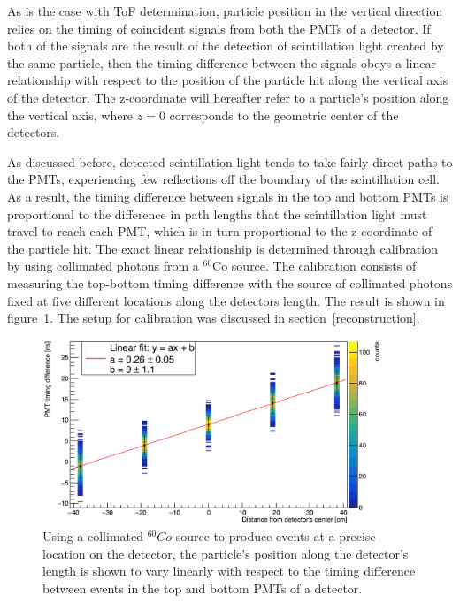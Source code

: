 As is the case with ToF determination, particle position in the vertical direction relies on the timing of coincident signals from both the PMTs of a detector. If both of the signals are the result of the detection of scintillation light created by the same particle, then the timing difference between the signals obeys a linear relationship with respect to the position of the particle hit along the vertical axis of the detector. The z-coordinate will hereafter refer to a particle's position along the vertical axis, where $z=0$ corresponds to the geometric center of the detectors. 

As discussed before, detected scintillation light tends to take fairly direct paths to the PMTs, experiencing few reflections off the boundary of the scintillation cell. As a result, the timing difference between signals in the top and bottom PMTs is proportional to the difference in path lengths that the scintillation light must travel to reach each PMT, which is in turn proportional to the z-coordinate of the particle hit. The exact linear relationship is determined through calibration by using collimated photons from a $^{60}$Co source. The calibration consists of measuring the top-bottom timing difference with the source of collimated photons fixed at five different locations along the detectors length. The result is shown in figure~\ref{fig:PMTDifference}. The setup for calibration was discussed in section~\ref{reconstruction}.

\begin{figure}
    \centering
    \includegraphics[width = 0.9\textwidth]{Content/Methods/PMTDifference.png}
    \caption{Using a collimated $^{60}Co$ source to produce events at a precise location on the detector, the particle's position along the detector's length is shown to vary linearly with respect to the timing difference between events in the top and bottom PMTs of a detector.}
    \label{fig:PMTDifference}
\end{figure}
